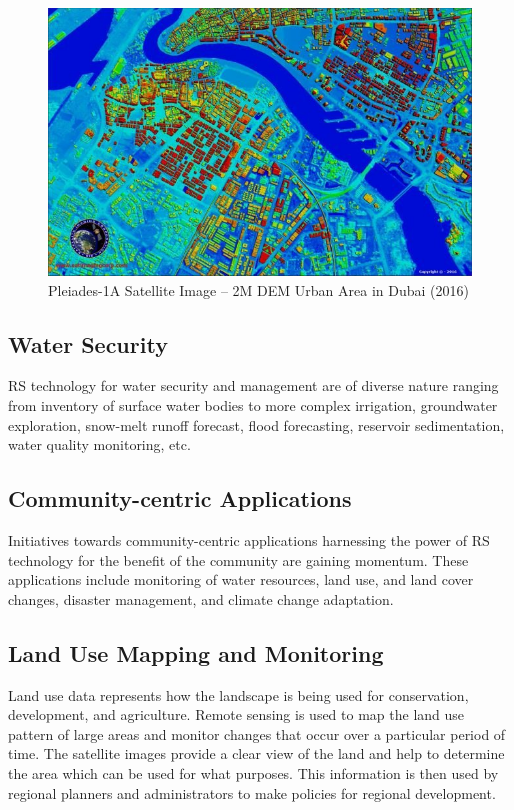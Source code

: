 \documentclass[conference]{IEEEtran}
\begin{document}
\begin{figure}
    \centering
    \includegraphics[width=\linewidth]{images/urbanplanning.jpg}
    \caption{Pleiades-1A Satellite Image – 2M DEM Urban Area in Dubai (2016)}
    \label{fig:urban-planning}
\end{figure}

\subsection{Water Security}
RS technology for water security and management are of diverse nature ranging from inventory of surface water bodies to more complex irrigation, groundwater exploration, snow-melt runoff forecast, flood forecasting, reservoir sedimentation, water quality monitoring, etc. 


\subsection{Community-centric Applications}
Initiatives towards community-centric applications harnessing the power of RS technology for the benefit of the community are gaining momentum. These applications include monitoring of water resources, land use, and land cover changes, disaster management, and climate change adaptation.

\subsection{Land Use Mapping and Monitoring}
Land use data represents how the landscape is being used for conservation, development, and agriculture. Remote sensing is used to map the land use pattern of large areas and monitor changes that occur over a particular period of time.
The satellite images provide a clear view of the land and help to determine the area which can be used for what purposes. This information is then used by regional planners and administrators to make policies for regional development.
\end{document}
